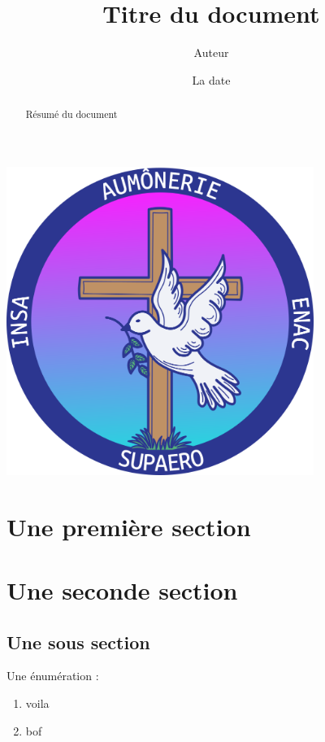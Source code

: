 \documentclass[10pt]{article}
\title{Titre du document}
\author{Auteur}
\date{La date}
\begin{document}
    \maketitle

    \begin{center}
      \includegraphics[width=10cm]{logoAumonerie.png}
    \end{center}

    \begin{abstract}
        Résumé du document
    \end{abstract}

    \newpage
    \AddToShipoutPicture{\BackgroundPic} 
    \fontsize{12}{12}\selectfont
    \tableofcontents %
    \newpage %
    
    \section{Une première section}
    
    \section{Une seconde section}
    
    \subsection{Une sous section}

    Une énumération :
    \begin{enumerate}
        \item voila
        \item bof
    \end{enumerate}
\end{document}
